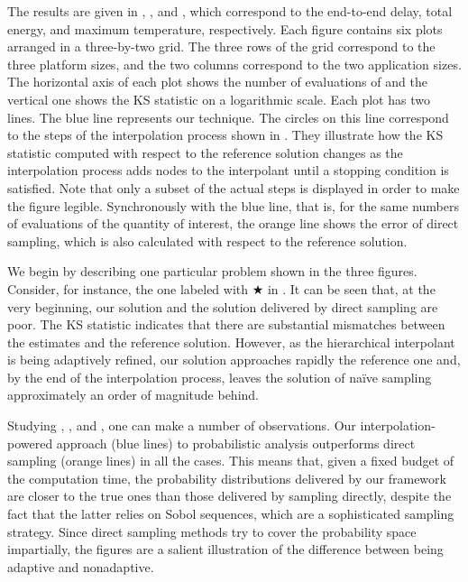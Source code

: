 The results are given in ,
, and , which
correspond to the end-to-end delay, total energy, and maximum temperature,
respectively. Each figure contains six plots arranged in a three-by-two grid.
The three rows of the grid correspond to the three platform sizes, and the two
columns correspond to the two application sizes. The horizontal axis of each
plot shows the number of evaluations of \g and the vertical one shows the
\ac{KS} statistic on a logarithmic scale. Each plot has two lines. The blue line
represents our technique. The circles on this line correspond to the steps of
the interpolation process shown in . They illustrate how the
\ac{KS} statistic computed with respect to the reference solution changes as the
interpolation process adds nodes to the interpolant until a stopping condition
is satisfied. Note that only a subset of the actual steps is displayed in order
to make the figure legible. Synchronously with the blue line, that is, for the
same numbers of evaluations of the quantity of interest, the orange line shows
the error of direct sampling, which is also calculated with respect to the
reference solution.

We begin by describing one particular problem shown in the three figures.
Consider, for instance, the one labeled with $\bigstar$ in
. It can be seen that, at the very beginning, our
solution and the solution delivered by direct sampling are poor. The \ac{KS}
statistic indicates that there are substantial mismatches between the estimates
and the reference solution. However, as the hierarchical interpolant is being
adaptively refined, our solution approaches rapidly the reference one and, by
the end of the interpolation process, leaves the solution of naïve sampling
approximately an order of magnitude behind.

Studying , , and
, one can make a number of observations. Our
interpolation-powered approach (blue lines) to probabilistic analysis
outperforms direct sampling (orange lines) in all the cases. This means that,
given a fixed budget of the computation time, the probability distributions
delivered by our framework are closer to the true ones than those delivered by
sampling \g directly, despite the fact that the latter relies on Sobol
sequences, which are a sophisticated sampling strategy. Since direct sampling
methods try to cover the probability space impartially, the figures are a
salient illustration of the difference between being adaptive and nonadaptive.

